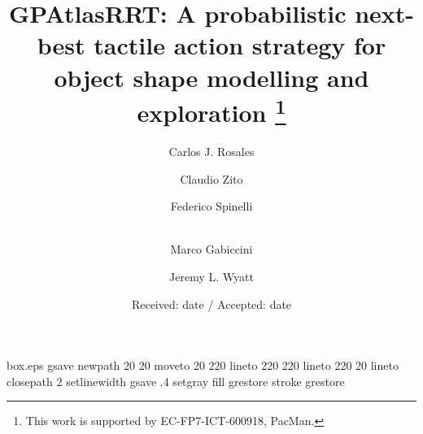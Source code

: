 \RequirePackage{fix-cm}

\begin{filecontents*}{box.eps}
gsave
newpath
  20 20 moveto
  20 220 lineto
  220 220 lineto
  220 20 lineto
closepath
2 setlinewidth
gsave
  .4 setgray fill
grestore
stroke
grestore
\end{filecontents*}

\documentclass[twocolumn,draft,natbib]{svjour3}
\smartqed  %

\usepackage{graphicx}

\usepackage{multirow}
\usepackage{colortbl}
\usepackage{booktabs}
\usepackage[algoruled,vlined]{algorithm2e}
\usepackage{amsmath,amsfonts,amssymb,amsxtra,amsbsy,amsopn}




\title{GPAtlasRRT: A probabilistic next-best tactile action strategy for object shape modelling and exploration
  \thanks{This work is supported by EC-FP7-ICT-600918, PacMan.}
}

\author{Carlos J. Rosales         \and
        Claudio Zito              \and
        Federico Spinelli         \and \\
        Marco Gabiccini           \and
        Jeremy L. Wyatt
}


\date{Received: date / Accepted: date}


